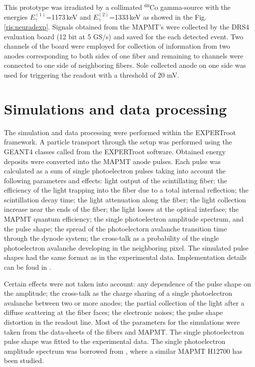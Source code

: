 \documentclass{webofc}
\newcommand{\er}{\textmd{EXPERTroot}}
\newcommand{\red}[1]{\textcolor{red}{#1}}
\begin{document}
This prototype was irradiated by a collimated $^{60}$Co gamma-source with the energies $E^{(1)}_{\gamma}$=1173\,keV and $E^{(2)}_{\gamma}$=1333\,keV as showed in the Fig.\,\ref{ris:neuradexp}. Signals obtained from the MAPMT's were collected by the DRS4 evaluation board \cite{DRS} (12 bit at 5 GS/s) and saved for the each detected event. 
Two channels of the board were employed for collection of information from two anodes corresponding to both sides of one fiber and remaining to channels were connected to one side of neighboring fibers.
Sole collected anode on one side was used for triggering the readout with a threshold of 20 mV.

\section{Simulations and data processing}

The simulation and data processing were performed within the \er\, framework.
A particle transport through the setup was performed using the GEANT4 \cite{geant4} classes called from the EXPERTroot software. Obtained energy deposits were converted into the MAPMT anode pulses.
Each pulse was calculated as a sum of single photoelectron pulses taking into account the following parameters and effects: light output of the scintillating fiber; the efficiency of the light trapping into the fiber due to a total internal reflection; the scintillation decay time; the light attenuation along the fiber; the light collection increase near the ends of the fiber; the light losses at the optical interface; the MAPMT quantum efficiency; the single photoelectron amplitude spectrum, and the pulse shape; the spread of the photoelectorn avalanche transition time through the dynode system; the cross-talk as a probability of the single photoelectron avalanche developing in the neighboring pixel.
The simulated pulse shapes had the same format as in the experimental data. Implementation details can be foud in \cite{neuradSim}. 

Certain effects were not taken into account: any dependence of the pulse shape on the amplitude; the cross-talk as the charge sharing of a single photoelectron avalanche between two or more anodes; the partial collection of the light after a diffuse scattering at the fiber faces; the electronic noises; the pulse shape distortion in the readout line. Most of the parameters for the simulations were taken from the data-sheets of the fibers and MAPMT. The single photoelectron pulse shape was fitted to the experimental data. The single photoelectron amplitude spectrum was borrowed from \cite{adam2018}, where a similar MAPMT H12700 has been studied.
\end{document}
